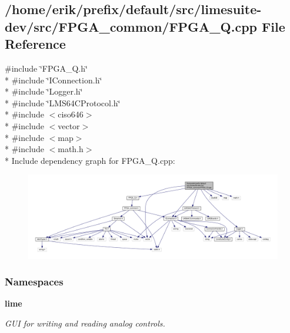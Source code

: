 \subsection{/home/erik/prefix/default/src/limesuite-\/dev/src/\+F\+P\+G\+A\+\_\+common/\+F\+P\+G\+A\+\_\+Q.cpp File Reference}
\label{FPGA__Q_8cpp}
{\ttfamily \#include \char`\"{}F\+P\+G\+A\+\_\+\+Q.\+h\char`\"{}}\\*
{\ttfamily \#include \char`\"{}I\+Connection.\+h\char`\"{}}\\*
{\ttfamily \#include \char`\"{}Logger.\+h\char`\"{}}\\*
{\ttfamily \#include \char`\"{}L\+M\+S64\+C\+Protocol.\+h\char`\"{}}\\*
{\ttfamily \#include $<$ciso646$>$}\\*
{\ttfamily \#include $<$vector$>$}\\*
{\ttfamily \#include $<$map$>$}\\*
{\ttfamily \#include $<$math.\+h$>$}\\*
Include dependency graph for F\+P\+G\+A\+\_\+\+Q.\+cpp\+:
\nopagebreak
\begin{figure}[H]
\begin{center}
\leavevmode
\includegraphics[width=350pt]{db/dea/FPGA__Q_8cpp__incl}
\end{center}
\end{figure}
\subsubsection*{Namespaces}
\begin{DoxyCompactItemize}
\item 
 {\bf lime}
\begin{DoxyCompactList}\small\item\em G\+UI for writing and reading analog controls. \end{DoxyCompactList}\end{DoxyCompactItemize}
